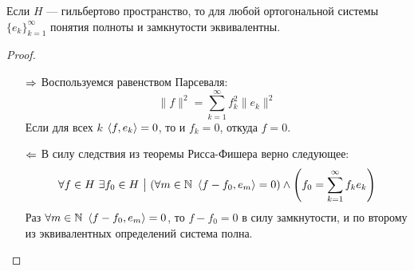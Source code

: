 \begin{theorem}
	Если $H$ --- гильбертово пространство, то для любой ортогональной системы $\{e_k\}_{k = 1}^\infty$ понятия полноты и замкнутости эквивалентны.
\end{theorem}

\begin{proof}~
	\begin{itemize}
		\item[$\Rightarrow$] Воспользуемся равенством Парсеваля:
		\[
			\|f\|^2 = \sum_{k = 1}^\infty f_k^2\|e_k\|^2
		\]
		Если для всех $k$ $\left\langle f, e_k\right\rangle = 0$, то и $f_k = 0$, откуда $f = 0$.
		
		\item[$\Leftarrow$] В силу следствия из теоремы Рисса-Фишера верно следующее:
		\[
			\forall f \in H\ \exists f_0 \in H \ \big|\  (\forall m \in \mathbb{N}\ \left\langle f - f_0, e_m\right\rangle = 0) \wedge \left(f_0 = \sum_{k = 1}^\infty f_ke_k\right)
		\]
		Раз $\forall m \in \mathbb{N}\ \left\langle f - f_0, e_m\right\rangle = 0$, то $f - f_0 = 0$ в силу замкнутости, и по второму из эквивалентных определений система полна.
	\end{itemize}
\end{proof}